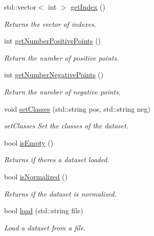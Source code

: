 \begin{DoxyCompactItemize}
std\+::vector$<$ int $>$ \hyperlink{class_data_a16685ae631c5bedc22c974980bc74c05}{get\+Index} ()
\begin{DoxyCompactList}\small\item\em Returns the vector of indexes. \end{DoxyCompactList}\item 
int \hyperlink{class_data_a45a39ab2144bcdd0ac1aa67d7d08a6cc}{get\+Number\+Positive\+Points} ()
\begin{DoxyCompactList}\small\item\em Return the number of positive points. \end{DoxyCompactList}\item 
int \hyperlink{class_data_a5166e74e946c2dbac75f383d63f018ea}{get\+Number\+Negative\+Points} ()
\begin{DoxyCompactList}\small\item\em Return the number of negative points. \end{DoxyCompactList}\item 
void \hyperlink{class_data_a6dd8a8a1e1659c76e5716fc8a23a86e2}{set\+Classes} (std\+::string pos, std\+::string neg)
\begin{DoxyCompactList}\small\item\em set\+Classes Set the classes of the dataset. \end{DoxyCompactList}\item 
bool \hyperlink{class_data_a93468d3b8b2ce0f73e369e5de160534e}{is\+Empty} ()
\begin{DoxyCompactList}\small\item\em Returns if there\textquotesingle{}s a dataset loaded. \end{DoxyCompactList}\item 
bool \hyperlink{class_data_ad96fc8e9c5ec9e40b1dc6d9670eefe0c}{is\+Normalized} ()
\begin{DoxyCompactList}\small\item\em Returns if the dataset is normalized. \end{DoxyCompactList}\item 
bool \hyperlink{class_data_ac2ed251251be234c607f486e16902112}{load} (std\+::string file)
\begin{DoxyCompactList}\small\item\em Load a dataset from a file. \end{DoxyCompactList}\item 
\mbox{\label{class_data_a44b749f64ffa35e034f9503fdec4917e}} 

\end{DoxyCompactItemize}
